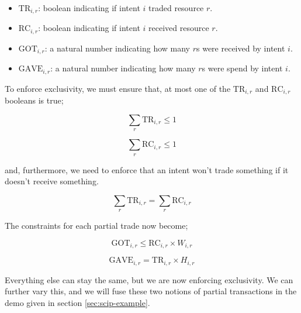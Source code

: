 \begin{itemize}
    \item $\text{TR}_{i, r}$:  boolean indicating if intent $i$ traded resource $r$.
    \item $\text{RC}_{i, r}$:  boolean indicating if intent $i$ received resource $r$.
    \item $\text{GOT}_{i, r}$: a natural number indicating how many $r$s were received by intent $i$.
    \item $\text{GAVE}_{i, r}$: a natural number indicating how many $r$s were spend by intent $i$.
\end{itemize}

To enforce exclusivity, we must ensure that, at most one of the $\text{TR}_{i, r}$ and $\text{RC}_{i, r}$ booleans is true;

\begin{equation}
    \sum_r \text{TR}_{i, r} \leq 1
\end{equation}

\begin{equation}
    \sum_r \text{RC}_{i, r} \leq 1
\end{equation}

and, furthermore, we need to enforce that an intent won't trade something if it doesn't receive something.

\begin{equation}
    \sum_r \text{TR}_{i, r} = \sum_r \text{RC}_{i, r}
\end{equation}

The constraints for each partial trade now become;

\begin{equation}
    \text{GOT}_{i, r} \leq \text{RC}_{i, r} \times W_{i, r}
\end{equation}

\begin{equation}
    \text{GAVE}_{i, r} = \text{TR}_{i, r} \times H_{i, r}
\end{equation}

Everything else can stay the same, but we are now enforcing exclusivity. We can further vary this, and we will fuse these two notions of partial transactions in the demo given in section \ref{sec:scip-example}.



